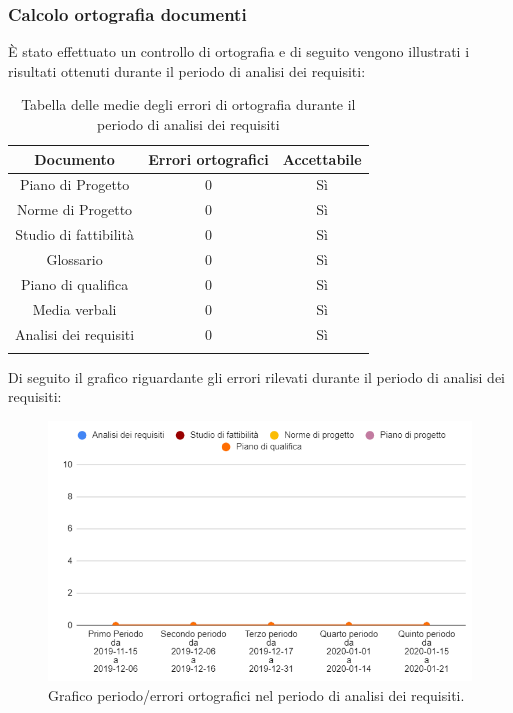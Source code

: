\subsubsection{Calcolo ortografia documenti}
È stato effettuato un controllo di ortografia e di seguito vengono illustrati i risultati ottenuti durante il periodo di analisi dei requisiti:

\begin{center}
	\begin{longtable}{|c|c|c|}
	\hline
	\rowcolor{lighter-grayer}
	\textbf{Documento} & \textbf{Errori ortografici} & \textbf{Accettabile} \\
	\hline
	\endfirsthead

	\hline
	Piano di Progetto & 0 & Sì \\
	\hline
	\hline
	Norme di Progetto &  0 & Sì \\
	\hline
	\hline
	Studio di fattibilità & 0 & Sì \\
	\hline
	\hline
	Glossario & 0 & Sì \\
	\hline
	\hline
	Piano di qualifica & 0 & Sì \\
	\hline
	\hline
	Media verbali & 0 & Sì \\
	\hline
	\hline
	Analisi dei requisiti & 0 & Sì \\
	\hline
	\caption{Tabella delle medie degli errori di ortografia durante il periodo di analisi dei requisiti}
	\end{longtable}
\end{center}

Di seguito il grafico riguardante gli errori rilevati durante il periodo di analisi dei requisiti:

\begin{figure}[H]
	\centering
	\includegraphics[width=0.8\linewidth]{./res/images/ortografia.png}
	\caption{Grafico periodo/errori ortografici nel periodo di analisi dei requisiti.}
	\label{fig:Grafico errori ortografici durante il periodo di analisi dei requisiti.}
\end{figure}
